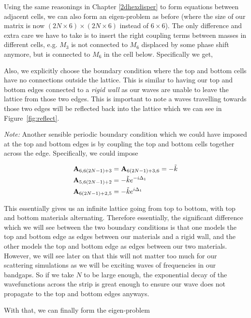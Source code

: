 Using the same reasonings in Chapter \ref{2dhexdisper} to form equations
between adjacent cells, we can also form an eigen-problem as before (where the
size of our matrix is now $(2N \times 6) \times (2N \times 6)$ instead of $6
\times 6$). The only difference and extra care we have to take is to insert the
right coupling terms between masses in different cells, e.g. $M_3$ is not
connected to $M_6$ displaced by some phase shift anymore, but is connected to
$M_6$ in the cell below. Specifically we get, 

Also, we explicitly choose the boundary condition where the top and bottom
cells have no connections outside the lattice. This is similar to having our
top and bottom edges connected to a \textit{rigid wall} as our waves are unable
to leave the lattice from those two edges. This is important to note a waves
travelling towards those two edges will be reflected back into the lattice
which we can see in Figure~\ref{fig:reflect}.

\textit{Note:} Another sensible periodic boundary condition which we could have
imposed at the top and bottom edges is by coupling the top and bottom cells
together across the edge. Specifically, we could impose

\begin{align}
  \mathbf{A}_{6,6(2N-1)+3}&=\mathbf{A}_{6(2N-1)+3,6}=-\tilde{k} \\
  \mathbf{A}_{5,6(2N-1)+2}&=-\tilde{k}e^{-i\Delta_1} \\
  \mathbf{A}_{6(2N-1)+2,5}&=-\tilde{k}e^{i\Delta_1} 
\end{align}

This essentially gives us an infinite lattice going
from top to bottom, with top and bottom materials alternating. Therefore
essentially, the significant difference which we will see between the two
boundary conditions is that one models the top and bottom edge as edges between
our materials and a rigid wall, and the other models the top and bottom edge as
edges between our two materials. However, we will see later on that this will
not matter too much for our scattering simulations as we will be exciting waves
of frequencies in our bandgaps. So if we take $N$ to be large enough, the
exponential decay of the wavefunctions across the strip is great enough to
ensure our wave does not propagate to the top and bottom edges anyways.

With that, we can finally form the eigen-problem

